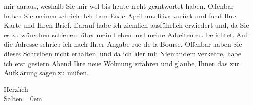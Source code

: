               mir daraus, weshalb Sie mir wol bis heute nicht
               geantwortet haben. Offenbar haben Sie meinen \label{K_L03265-2v}\label{K_L03265-2} schrieb. Ich kam Ende April aus Riva zurück
               und fand Ihre Karte und Ihren Brief. Darauf habe ich ziemlich ausführlich erwiedert
               und, da Sie es zu wünschen schienen, über mein Leben und meine Arbeiten ec.
               berichtet. Auf die Adresse schrieb ich nach Ihrer Angabe rue de la Bourse. Offenbar haben Sie dieses Schreiben nicht
               erhalten, und da ich hier mit Niemandem verkehre, habe ich erst gestern{ }Abend Ihre neue Wohnung erfahren und glaube, Ihnen das zur Aufklärung
               sagen zu müßen.\pend
           
\pstart
           Herzlich {\\[\baselineskip]}\spacefill\mbox{Salten}\pend
           \leftskip=0em{}\endnumbering{}  \newcommand{\dateiname}{L03265}\newcommand{\titel}{Felix Salten an Arthur Schnitzler, 16. 5. 1897}\newcommand{\editorInnen}{Martin Anton Müller und Laura Untner}

